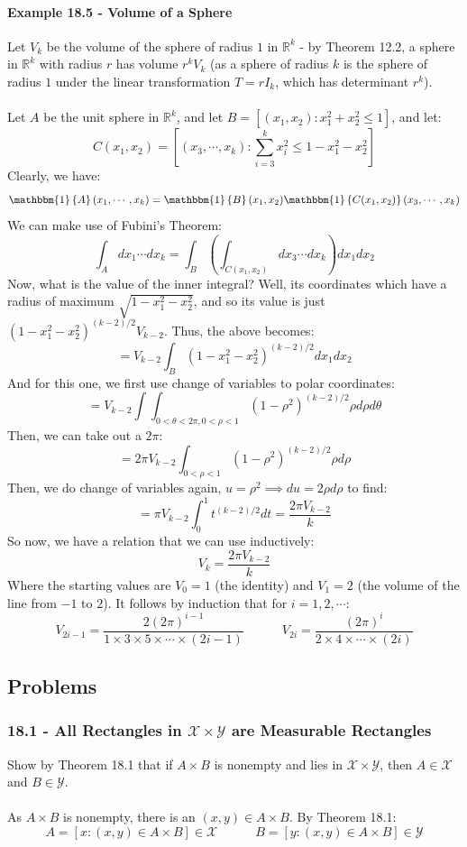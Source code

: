 \documentclass[12pt,a4paper]{article}
\newcommand{\1}[1]{\mathbbm{1}\left\{ #1 \right\}}
\newcommand{\R}{\mathbb{R}}
\newcommand{\xcal}{\mathcal{X}}
\newcommand{\ycal}{\mathcal{Y}}
\begin{document}
\paragraph{Example 18.5 - Volume of a Sphere} Let $V_k$ be the volume of the sphere of radius $1$ in $\R^k$ - by Theorem 12.2, a sphere in $\R^k$ with radius $r$ has volume $r^kV_k$ (as a sphere of radius $k$ is the sphere of radius $1$ under the linear transformation $T = rI_k$, which has determinant $r^k$). 
\\\\
Let $A$ be the unit sphere in $\R^k$, and let $B = [(x_1, x_2) : x_1^2 + x_2^2 \leq 1]$, and let:
$$
	C(x_1, x_2) = \left[(x_3, \cdots, x_k) : \sum_{i=3}^k x_i^2 \leq 1 - x_1^2 - x_2^2\right]
$$
Clearly, we have:
$$
	\1{A}(x_1, \cdots, x_k) = \1{B}(x_1, x_2)\1{C(x_1, x_2)}(x_3, \cdots, x_k)
$$
We can make use of Fubini's Theorem:
$$
	\int_A dx_1 \cdots dx_k =
	\int_B \left(\int_{C(x_1, x_2)} dx_3 \cdots dx_k\right) dx_1dx_2
$$
Now, what is the value of the inner integral? Well, its coordinates which have a radius of maximum $\sqrt{1 - x_1^2 - x_2^2}$, and so its value is just $(1-x_1^2-x_2^2)^{(k-2)/2}V_{k-2}$. Thus, the above becomes:
$$
	= V_{k-2} \int_B (1-x_1^2-x_2^2)^{(k-2)/2} dx_1dx_2
$$
And for this one, we first use change of variables to polar coordinates:
$$
	= V_{k-2} \int\int_{0 < \theta < 2\pi, 0 < \rho < 1} (1-\rho^2)^{(k-2)/2} \rho d\rho d\theta
$$
Then, we can take out a $2\pi$:
$$
	= 2\pi V_{k-2} \int_{0 < \rho < 1} (1-\rho^2)^{(k-2)/2} \rho d\rho
$$
Then, we do change of variables again, $u = \rho^2 \implies du = 2\rho d\rho$ to find:
$$
	= \pi V_{k-2} \int_0^1 t^{(k-2)/2} dt = \frac{2\pi V_{k-2}}{k}
$$
So now, we have a relation that we can use inductively:
$$
	V_k = \frac{2\pi V_{k-2}}{k}
$$
Where the starting values are $V_0 = 1$ (the identity) and $V_1 = 2$ (the volume of the line from $-1$ to $2$). It follows by induction that for $i = 1, 2, \cdots$:
$$
	V_{2i-1} = \frac{2(2\pi)^{i-1}}{1 \times 3 \times 5 \times \cdots \times (2i - 1)}
	\quad\quad\quad
	V_{2i} = \frac{(2\pi)^i}{2 \times 4 \times \cdots \times (2i)}	
$$

\subsection{Problems}
\subsubsection{18.1 - All Rectangles in $\xcal \times \ycal$ are Measurable Rectangles} Show by Theorem 18.1 that if $A \times B$ is nonempty and lies in $\xcal \times \ycal$, then $A \in \xcal$ and $B \in \ycal$.
\\\\
As $A \times B$ is nonempty, there is an $(x, y) \in A \times B$. By Theorem 18.1:
$$
	A = [x : (x, y) \in A \times B] \in \xcal
	\quad\quad\quad
	B = [y : (x, y) \in A \times B] \in \ycal
$$
\end{document}
